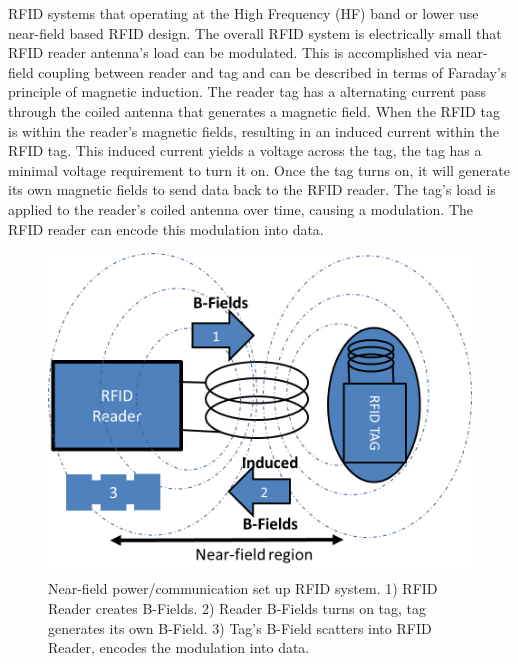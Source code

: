 RFID systems that operating at the High Frequency (HF) band or lower use near-field based RFID design. The overall RFID system is electrically small that RFID reader antenna's load can be modulated. This is accomplished via near-field coupling between reader and tag and can be described in terms of Faraday's principle of magnetic induction. The reader tag has a alternating current pass through the coiled antenna that generates a magnetic field. When the RFID tag is within the reader's magnetic fields, resulting in an induced current within the RFID tag. This induced current yields a voltage across the tag, the tag has a minimal voltage requirement to turn it on. Once the tag turns on, it will generate its own magnetic fields to send data back to the RFID reader. The tag's load is applied to the reader's coiled antenna over time, causing a modulation. The RFID reader can encode this modulation into data.   

\begin{figure}[htp]
    \centering
    \includegraphics[scale=0.6]{Figs/nearField.png}
    \caption{Near-field power/communication set up RFID system. 1) RFID Reader creates B-Fields. 2) Reader B-Fields turns on tag, tag generates its own B-Field. 3) Tag's B-Field scatters into RFID Reader, encodes the modulation into data.}
    \label{fig:RFIDBlocks}
\end{figure}




